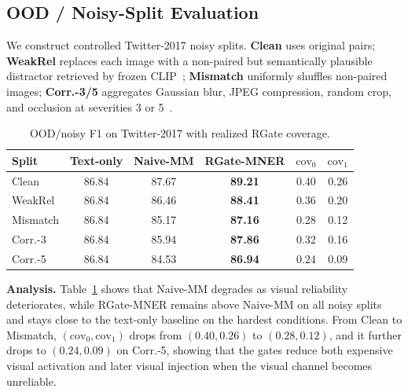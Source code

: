 \documentclass{llncs}
\begin{document}
\subsection{OOD / Noisy-Split Evaluation}
We construct controlled Twitter-2017 noisy splits. \textbf{Clean} uses original pairs; \textbf{WeakRel} replaces each image with a non-paired but semantically plausible distractor retrieved by frozen CLIP~\cite{radford_learning_2021}; \textbf{Mismatch} uniformly shuffles non-paired images; \textbf{Corr.-3/5} aggregates Gaussian blur, JPEG compression, random crop, and occlusion at severities 3 or 5~\cite{hendrycks_benchmarking_2018}.
\FloatBarrier
\begin{table}[!htbp]
\caption{OOD/noisy F1 on Twitter-2017 with realized RGate coverage.}
\centering
\footnotesize
\setlength{\tabcolsep}{4pt}
\renewcommand{\arraystretch}{0.95}
\begin{tabular}{lccccc}
\toprule
Split & Text-only & Naive-MM & RGate-MNER & $\mathrm{cov}_0$ & $\mathrm{cov}_1$ \\
\midrule
Clean    & 86.84 & 87.67 & \textbf{89.21} & 0.40 & 0.26 \\
WeakRel  & 86.84 & 86.46 & \textbf{88.41} & 0.36 & 0.20 \\
Mismatch & 86.84 & 85.17 & \textbf{87.16} & 0.28 & 0.12 \\
Corr.-3  & 86.84 & 85.94 & \textbf{87.86} & 0.32 & 0.16 \\
Corr.-5  & 86.84 & 84.53 & \textbf{86.94} & 0.24 & 0.09 \\
\bottomrule
\end{tabular}
\label{tab:ood_split}
\end{table}
\FloatBarrier

\noindent\textbf{Analysis.}
Table~\ref{tab:ood_split} shows that Naive-MM degrades as visual reliability deteriorates, while RGate-MNER remains above Naive-MM on all noisy splits and stays close to the text-only baseline on the hardest conditions. From Clean to Mismatch, $(\mathrm{cov}_0,\mathrm{cov}_1)$ drops from $(0.40,0.26)$ to $(0.28,0.12)$, and it further drops to $(0.24,0.09)$ on Corr.-5, showing that the gates reduce both expensive visual activation and later visual injection when the visual channel becomes unreliable.

\FloatBarrier
\end{document}
